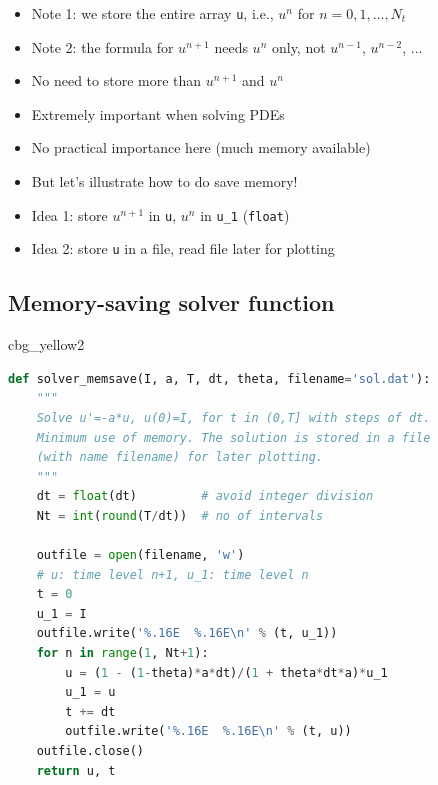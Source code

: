 \documentclass[%
oneside,                 %
final,                   %
10pt]{article}
\newenvironment{_cod_tight}[1]{
   \def\FrameCommand{\colorbox{#1}}
   \FrameRule0.6pt\MakeFramed {\FrameRestore}\vskip3mm}
   {\vskip0mm\endMakeFramed}
\newenvironment{cod}[1]{
\bgroup\rmfamily
\fboxsep=0mm\relax
\begin{_cod_tight}{#1}
\list{}{\parsep=-2mm\parskip=0mm\topsep=0pt\leftmargin=2mm
\rightmargin=2\leftmargin\leftmargin=4pt\relax}
\item\relax}
{\endlist\end{_cod_tight}\egroup}
\begin{document}
\begin{itemize}
 \item Note 1: we store the entire array \texttt{u}, i.e., $u^n$ for $n=0,1,\ldots,N_t$

 \item Note 2: the formula for $u^{n+1}$ needs $u^n$ only, not $u^{n-1}$, $u^{n-2}$, ...

 \item No need to store more than $u^{n+1}$ and $u^{n}$

 \item Extremely important when solving PDEs

 \item No practical importance here (much memory available)

 \item But let's illustrate how to do save memory!

 \item Idea 1: store $u^{n+1}$ in \texttt{u}, $u^n$ in \Verb!u_1! (\texttt{float})

 \item Idea 2: store \texttt{u} in a file, read file later for plotting
\end{itemize}

\noindent
\subsection*{Memory-saving solver function}

\begin{cod}{cbg_yellow2}\begin{lstlisting}[language=Python,style=simple,xleftmargin=2mm]
def solver_memsave(I, a, T, dt, theta, filename='sol.dat'):
    """
    Solve u'=-a*u, u(0)=I, for t in (0,T] with steps of dt.
    Minimum use of memory. The solution is stored in a file
    (with name filename) for later plotting.
    """
    dt = float(dt)         # avoid integer division
    Nt = int(round(T/dt))  # no of intervals

    outfile = open(filename, 'w')
    # u: time level n+1, u_1: time level n
    t = 0
    u_1 = I
    outfile.write('%.16E  %.16E\n' % (t, u_1))
    for n in range(1, Nt+1):
        u = (1 - (1-theta)*a*dt)/(1 + theta*dt*a)*u_1
        u_1 = u
        t += dt
        outfile.write('%.16E  %.16E\n' % (t, u))
    outfile.close()
    return u, t
\end{lstlisting}\end{cod}
\noindent
\end{document}

